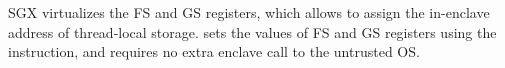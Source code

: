 

SGX virtualizes the FS and GS registers,
which allows \graphenesgx{} to assign the in-enclave address of thread-local storage.
\graphenesgx{} sets the values of FS and GS registers
using the  instruction,
and requires no extra enclave call to the untrusted OS.


